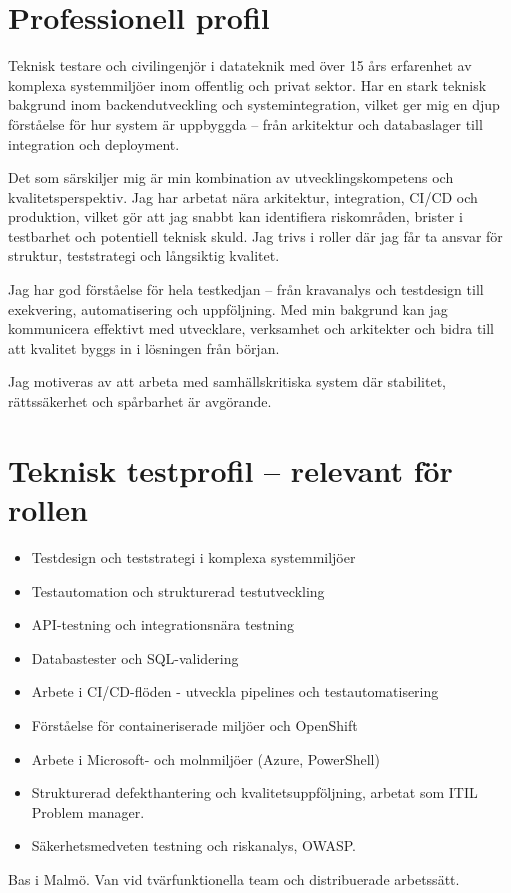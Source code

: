 \section*{Professionell profil}

Teknisk testare och civilingenjör i datateknik med över 15 års erfarenhet av komplexa systemmiljöer inom offentlig och privat sektor. Har en stark teknisk bakgrund inom backendutveckling och systemintegration, vilket ger mig en djup förståelse för hur system är uppbyggda – från arkitektur och databaslager till integration och deployment.

Det som särskiljer mig är min kombination av utvecklingskompetens och kvalitetsperspektiv. Jag har arbetat nära arkitektur, integration, CI/CD och produktion, vilket gör att jag snabbt kan identifiera riskområden, brister i testbarhet och potentiell teknisk skuld. Jag trivs i roller där jag får ta ansvar för struktur, teststrategi och långsiktig kvalitet.

Jag har god förståelse för hela testkedjan – från kravanalys och testdesign till exekvering, automatisering och uppföljning. Med min bakgrund kan jag kommunicera effektivt med utvecklare, verksamhet och arkitekter och bidra till att kvalitet byggs in i lösningen från början.

Jag motiveras av att arbeta med samhällskritiska system där stabilitet, rättssäkerhet och spårbarhet är avgörande.

\section*{Teknisk testprofil – relevant för rollen}

\begin{itemize}[noitemsep]
  \item Testdesign och teststrategi i komplexa systemmiljöer
  \item Testautomation och strukturerad testutveckling
  \item API-testning och integrationsnära testning
  \item Databastester och SQL-validering
  \item Arbete i CI/CD-flöden - utveckla pipelines och testautomatisering
  \item Förståelse för containeriserade miljöer och OpenShift
  \item Arbete i Microsoft- och molnmiljöer (Azure, PowerShell)
  \item Strukturerad defekthantering och kvalitetsuppföljning, arbetat som ITIL Problem manager.
  \item Säkerhetsmedveten testning och riskanalys, OWASP.
\end{itemize}

Bas i Malmö. Van vid tvärfunktionella team och distribuerade arbetssätt.